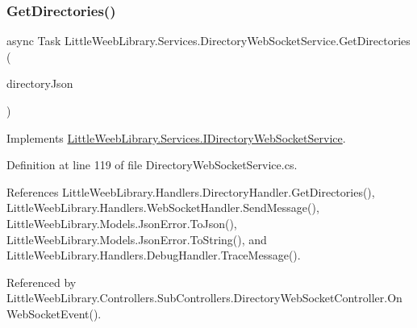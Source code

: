 \mbox{\label{class_little_weeb_library_1_1_services_1_1_directory_web_socket_service_a1fee74b9f658b29f4c2bb643a48425e0}} 
\subsubsection{\texorpdfstring{Get\+Directories()}{GetDirectories()}}
{\footnotesize\ttfamily async Task Little\+Weeb\+Library.\+Services.\+Directory\+Web\+Socket\+Service.\+Get\+Directories (\begin{DoxyParamCaption}\item[{J\+Object}]{directory\+Json }\end{DoxyParamCaption})}



Implements \mbox{\hyperlink{interface_little_weeb_library_1_1_services_1_1_i_directory_web_socket_service_a6062c7a41f8cbbe4b78295e4073c5225}{Little\+Weeb\+Library.\+Services.\+I\+Directory\+Web\+Socket\+Service}}.



Definition at line 119 of file Directory\+Web\+Socket\+Service.\+cs.



References Little\+Weeb\+Library.\+Handlers.\+Directory\+Handler.\+Get\+Directories(), Little\+Weeb\+Library.\+Handlers.\+Web\+Socket\+Handler.\+Send\+Message(), Little\+Weeb\+Library.\+Models.\+Json\+Error.\+To\+Json(), Little\+Weeb\+Library.\+Models.\+Json\+Error.\+To\+String(), and Little\+Weeb\+Library.\+Handlers.\+Debug\+Handler.\+Trace\+Message().



Referenced by Little\+Weeb\+Library.\+Controllers.\+Sub\+Controllers.\+Directory\+Web\+Socket\+Controller.\+On\+Web\+Socket\+Event().


